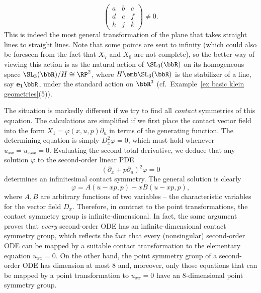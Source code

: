 \begin{example}
\[\begin{pmatrix}
        a & b& c\\ d & e&f\\h&j&k
    \end{pmatrix}\neq 0.\]
    This is indeed the most general transformation of the plane that takes straight lines to straight lines. Note that some points are sent to infinity (which could also be foreseen from the fact that $X_7$ and $X_8$ are not complete), so the better way of viewing this action is as the natural action of $\SL_3(\bbR)$ on its homogeneous space $\SL_3(\bbR)\slash H\cong \RP^2$, where $H\emb \SL_3(\bbR)$ is the stabilizer of a line, say $\bf{e}_1\bbR$, under the standard action on $\bbR^3$ (cf.\ Example~\ref{ex basic klein geometries}(5)).

    The situation is markedly different if we try to find all \emph{contact} symmetries of this equation. The calculations are simplified if we first place the contact vector field into the form $X_1=\varphi(x,u,p)\partial_u$ in terms of the generating function. The determining equation is simply $D_x^2 \varphi=0$, which must hold whenever $u_{xx}=u_{xxx}=0$. Evaluating the second total derivative, we deduce that any solution $\varphi$ to the second-order linear PDE 
    \[(\partial_x+p\partial_u)^2 \varphi=0\]
    determines an infinitesimal contact symmetry. The general solution is clearly 
    \[\varphi=A(u-xp,p)+xB(u-xp,p),\]
    where $A,B$ are arbitrary functions of two variables -- the characteristic variables for the vector field $D_x$. Therefore, in contrast to the point transformations, the contact symmetry group is infinite-dimensional. In fact, the same argument proves that \emph{every} second-order ODE has an infinite-dimensional contact symmetry group, which reflects the fact that every (nonsingular) second-order ODE can be mapped by a suitable contact transformation to the elementary equation $u_{xx}=0$. On the other hand, the point symmetry group of a second-order ODE has dimension at most $8$ and, moreover, only those equations that can be mapped by a point transformation to $u_{xx}=0$ have an $8$-dimensional point symmetry group.
\end{example}


